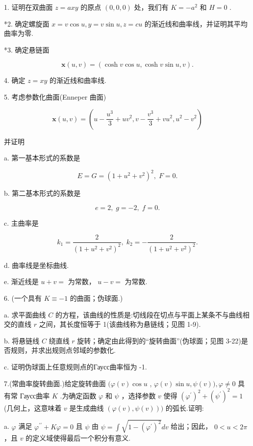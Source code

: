 \exerciseline

1. 证明在双曲面 \(z = {axy}\) 的原点 \(\left( {0,0,0}\right)\) 处，我们有 \(K =  - {a}^{2}\) 和 \(H = 0\) .

*2. 确定螺旋面 \(x = v\cos u,y = v\sin u,z = {cu}\) 的渐近线和曲率线，并证明其平均曲率为零.

*3. 确定悬链面

\[
\mathbf{x}\left( {u,v}\right)  = \left( {\cosh v\cos u,\cosh v\sin u,v}\right) .
\]

4. 确定 \(z = {xy}\) 的渐近线和曲率线.

5. 考虑参数化曲面(Enneper 曲面)

\[
\mathbf{x}\left( {u,v}\right)  = \left( {u - \frac{{u}^{3}}{3} + u{v}^{2},v - \frac{{v}^{3}}{3} + v{u}^{2},{u}^{2} - {v}^{2}}\right)
\]

并证明

a. 第一基本形式的系数是

\[
E = G = {\left( 1 + {u}^{2} + {v}^{2}\right) }^{2},\;F = 0.
\]

b. 第二基本形式的系数是

\[
e = 2,\;g =  - 2,\;f = 0.
\]

c. 主曲率是

\[
{k}_{1} = \frac{2}{{\left( 1 + {u}^{2} + {v}^{2}\right) }^{2}},\;{k}_{2} =  - \frac{2}{{\left( 1 + {u}^{2} + {v}^{2}\right) }^{2}}.
\]

d. 曲率线是坐标曲线.

e. 渐近线是 \(u + v =\) 为常数， \(u - v =\) 为常数.

6. (一个具有 \(K \equiv   - 1\) 的曲面；伪球面.)

a. 求平面曲线 \(C\) 的方程，该曲线的性质是:切线段在切点与平面上某条不与曲线相交的直线 \(r\) 之间，其长度恒等于 1(该曲线称为悬链线；见图 1-9).

b. 将悬链线 \(C\) 绕直线 \(r\) 旋转；确定由此得到的“旋转曲面”(伪球面；见图 3-22)是否规则，并求出规则点邻域的参数化.

c. 证明伪球面上任意规则点的Гаусс曲率恒为 -1.

7.(常曲率旋转曲面.)给定旋转曲面 \((\varphi \left( v\right) \cos u\) , \(\varphi \left( v\right) \sin u,\psi \left( v\right) ),\varphi  \neq  0\) 具有常 Гаусс曲率 \(K\) .为确定函数 \(\varphi\) 和 \(\psi\) ，选择参数 \(v\) 使得 \({\left( {\varphi }^{\prime }\right) }^{2} + {\left( {\psi }^{\prime }\right) }^{2} = 1\) (几何上，这意味着 \(v\) 是生成曲线 \(\left( {\varphi \left( v\right) ,\psi \left( v\right) }\right) )\) 的弧长.证明:

a. \(\varphi\) 满足 \({\varphi }^{\prime \prime } + {K\varphi } = 0\) 且 \(\psi\) 由 \(\psi  = \int \sqrt{1 - {\left( {\varphi }^{\prime }\right) }^{2}}{dv}\) 给出；因此， \(0 < u < {2\pi }\) ，且 \(v\) 的定义域使得最后一个积分有意义.

